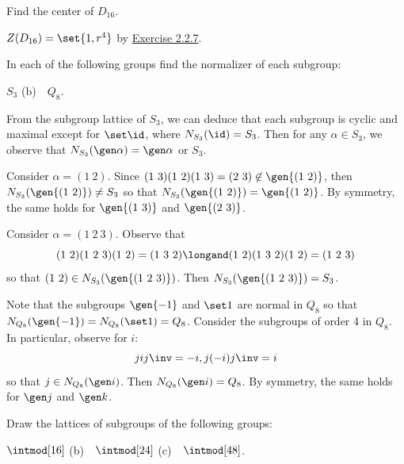 \begin{exercise}\label{ex2.5.7}
    Find the center of $D_{16}$.
\end{exercise}

\begin{sol}
    $Z(D_{16}) = \set{1, r^4}$ by \hyperref[ex2.2.7]{Exercise 2.2.7}.
\end{sol}

\begin{exercise}\label{ex2.5.8}
    In each of the following groups find the normalizer of each subgroup:
    \begin{subproblems}
        \item $S_3$ \quad (b)~~$Q_8$.
    \end{subproblems}
\end{exercise}

\begin{solalph}
    \item From the subgroup lattice of $S_3$, we can deduce that each subgroup is cyclic and maximal except for $\set\id$, where $N_{S_3}(\id) = S_3$. Then for any $\alpha \in S_3$, we observe that $N_{S_3}(\gen\alpha) = \gen\alpha$ or $S_3$.
    
    Consider $\alpha = (1\ 2)$. Since $(1\ 3)(1\ 2)(1\ 3) = (2\ 3) \not\in \gen{(1\ 2)}$, then $N_{S_3}(\gen{(1\ 2)}) \neq S_3$ so that $N_{S_3}(\gen{(1\ 2)}) = \gen{(1\ 2)}$. By symmetry, the same holds for $\gen{(1\ 3)}$ and $\gen{(2\ 3)}$.

    Consider $\alpha = (1\ 2\ 3)$. Observe that
    \[(1\ 2)(1\ 2\ 3)(1\ 2) = (1\ 3\ 2) \longand (1\ 2)(1\ 3\ 2)(1\ 2) = (1\ 2\ 3)\]
    so that $(1\ 2) \in N_{S_3}(\gen{(1\ 2\ 3)})$. Then $N_{S_3}(\gen{(1\ 2\ 3)}) = S_3$.
    \item Note that the subgroups $\gen{-1}$ and $\set 1$ are normal in $Q_8$ so that $N_{Q_8}(\gen{-1}) = N_{Q_8}(\set 1) = Q_8$. Consider the subgroups of order 4 in $Q_8$. In particular, observe for $i$:
    \[jij\inv = -i, j(-i)j\inv = i\]
    so that $j \in N_{Q_8}(\gen i)$. Then $N_{Q_8}(\gen i) = Q_8$. By symmetry, the same holds for $\gen j$ and $\gen k$.
\end{solalph}


\begin{exercise}\label{ex2.5.9}
    Draw the lattices of subgroups of the following groups:
    \begin{subproblems}
        \item $\intmod[16]$ \quad (b)~~$\intmod[24]$ \quad (c)~~$\intmod[48]$.
    \end{subproblems}
\end{exercise}

